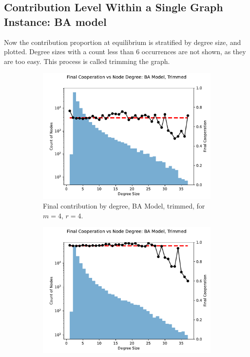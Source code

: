 \subsection{Contribution Level Within a Single Graph Instance: BA model } 
Now the contribution proportion at equilibrium is stratified by degree size, and plotted. Degree sizes with a count less than 6 occurrences are not shown, as they are too easy. This process is called trimming the graph. \\

\FloatBarrier 
\begin{figure}[!h]
  \begin{subfigure}[b]{0.45\textwidth}
    \includegraphics[width=1.1\textwidth]{images/ID_BA_node_groups_m_4_phi_4_trimmed.pdf}
    \caption{Final contribution by degree, BA Model, trimmed, for $m=4$, $r=4$.   }
    \label{ID_by_degree_m_4_phi_4}
  \end{subfigure}
  \hfill
  \begin{subfigure}[b]{0.45\textwidth}
    \includegraphics[width=1.1\textwidth]{images/ID_BA_node_groups_m_4_phi_6_trimmed.pdf}

\end{subfigure}
\end{figure}
